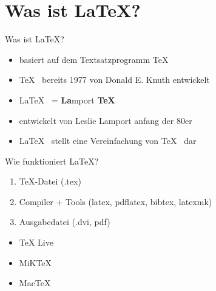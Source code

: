 
\section{Was ist \LaTeX ?}
%
\begin{frame}{Was ist \LaTeX ?}
	\begin{itemize}[<+->]
	\item basiert auf dem Textsatzprogramm \TeX
	\item \TeX \mbox{ } bereits 1977 von Donald E. Knuth entwickelt
	\item \LaTeX \mbox{ } = \textbf{La}mport \textbf{TeX}
	\item entwickelt von Leslie Lamport anfang der 80er 
	\item \LaTeX \mbox{ } stellt eine Vereinfachung von \TeX \mbox{ } dar
	\end{itemize}
\end{frame}

\begin{frame}{Wie funktioniert \LaTeX?}
	\begin{enumerate}[<+->]
	\item \TeX -Datei (.tex)
	\item Compiler + Tools (latex, pdflatex, bibtex, latexmk)
	\item Ausgabedatei (.dvi, pdf)
	\end{enumerate}

	\begin{itemize}[<+->]
	\item TeX Live
	\item MiKTeX
	\item MacTeX
	\end{itemize}
\end{frame}




